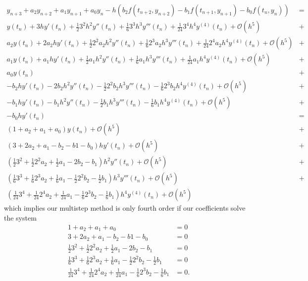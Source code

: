 \documentclass[a4paper,12pt]{article}
\newcommand{\bigO}{\mathcal{O}}
\begin{document}
\begin{enumerate}[label = (\arabic*)]
	\begin{align*}
		y_{n + 3} + a_2 y_{n + 2} + a_1 y_{n + 1} + a_0 y_n - h(b_2 f(t_{n + 2}, y_{n + 2}) - b_1 f(t_{n + 1}, y_{n + 1}) - b_0 f(t_n, y_n)) &= \\
		y(t_n) + 3h y'(t_n) + \frac{1}{2} 3^2 h^2 y''(t_n) + \frac{1}{6} 3^3 h^3 y'''(t_n) + \frac{1}{24} 3^4 h^4 y^{(4)}(t_n) + \bigO(h^5) &+ \\
		a_2 y(t_n) + 2a_2 h y'(t_n) + \frac{1}{2} 2^2 a_2  h^2 y''(t_n) + \frac{1}{6} 2^3 a_2 h^3 y'''(t_n) + \frac{1}{24} 2^4 a_2 h^4 y^{(4)}(t_n) + \bigO(h^5) &+ \\
		a_1 y(t_n) + a_1 h y'(t_n) + \frac{1}{2} a_1 h^2 y''(t_n) + \frac{1}{6} a_1 h^3 y'''(t_n) + \frac{1}{24} a_1 h^4 y^{(4)}(t_n) + \bigO(h^5) &+ \\
		a_0 y(t_n) &+ \\
		- b_2 h y'(t_n) - 2 b_2 h^2 y''(t_n) - \frac{1}{2} 2^2 b_2 h^3 y'''(t_n) - \frac{1}{6} 2^3 b_2 h^4 y^{(4)}(t_n) + \bigO(h^5) &+ \\
		- b_1 h y'(t_n) - b_1 h^2 y''(t_n) - \frac{1}{2} b_1 h^3 y'''(t_n) - \frac{1}{6} b_1 h^4 y^{(4)}(t_n) + \bigO(h^5) &+ \\
		- b_0 h y'(t_n) &= \\
		(1 + a_2 + a_1 + a_0) y(t_n) + \bigO(h^5) &+ \\
		(3 + 2a_2 + a_1 - b_2 - b1 - b_0) h y'(t_n) + \bigO(h^5) &+ \\
		\left(\frac{1}{2}3^2 + \frac{1}{2}2^2 a_2 + \frac{1}{2}a_1 - 2 b_2 - b_1\right) h^2 y''(t_n) + \bigO(h^5) &+ \\
		\left(\frac{1}{6} 3^3 + \frac{1}{6} 2^3 a_2 + \frac{1}{6} a_1 - \frac{1}{2} 2^2 b_2 - \frac{1}{2} b_1\right) h^3 y'''(t_n) + \bigO(h^5) &+ \\
		\left(\frac{1}{24} 3^4 + \frac{1}{24} 2^4 a_2 + \frac{1}{24} a_1 - \frac{1}{6} 2^3 b_2 - \frac{1}{6} b_1\right) h^4 y^{(4)}(t_n) + \bigO(h^5)
	\end{align*}
	which implies our multistep method is only fourth order if our coefficients solve the system
	\begin{align*}
		1 + a_2 + a_1 + a_0 &= 0 \\
		3 + 2a_2 + a_1 - b_2 - b1 - b_0 &= 0 \\
		\frac{1}{2}3^2 + \frac{1}{2}2^2 a_2 + \frac{1}{2}a_1 - 2 b_2 - b_1&= 0 \\
		\frac{1}{6} 3^3 + \frac{1}{6} 2^3 a_2 + \frac{1}{6} a_1 - \frac{1}{2} 2^2 b_2 - \frac{1}{2} b_1 &= 0 \\
		\frac{1}{24} 3^4 + \frac{1}{24} 2^4 a_2 + \frac{1}{24} a_1 - \frac{1}{6} 2^3 b_2 - \frac{1}{6} b_1 &= 0.

\end{align*}
\end{enumerate}
\end{document}
